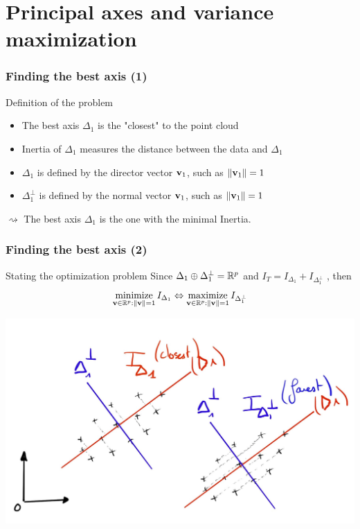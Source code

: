 \documentclass{beamer}\usepackage[]{graphicx}\usepackage[]{color}
\begin{document}
\section{Principal axes and variance maximization}

\begin{frame}
  \frametitle{Finding the best axis (1)}

  \begin{block}{Definition of the problem}
    \begin{itemize}
      \item The best axis $\Delta_1$ is the "closest" to the point cloud
      \item Inertia of $\Delta_1$ measures the distance between the data and $\Delta_1$
      \item $\Delta_1$ is defined by the director vector $\mathbf{v}_1$, such as $\| \mathbf{v}_1 \| = 1$
      \item $\Delta_1^\bot$ is defined by the normal  vector $\mathbf{v}_1$, such as $\| \mathbf{v}_1 \| = 1$
    \end{itemize}
    \alert{$\rightsquigarrow$ The best axis $\Delta_1$ is the one with the minimal Inertia.}
  \end{block}
  
\end{frame}

\begin{frame}
  \frametitle{Finding the best axis (2)}

  \begin{block}{Stating the optimization problem}
    Since $\Delta_1 \oplus \Delta_1^\bot = \mathbb{R}^p$ and $I_T = I_{\Delta_1} + I_{\Delta_1^\bot}$ , then
    \begin{equation*}
        \mathop{\mathrm{minimize}}_{\mathbf{v} \in \mathbb{R}^p: \|\mathbf{v}\| = 1} I_{\Delta_1} \Leftrightarrow \mathop{\mathrm{maximize}}_{\mathbf{v} \in \mathbb{R}^p: \|\mathbf{v}\| = 1} I_{\Delta_1^\bot}
    \end{equation*} 
  \end{block}  
  
  \includegraphics[width=.7\textwidth]{minimum_inertia}
  
\end{frame}
\end{document}
